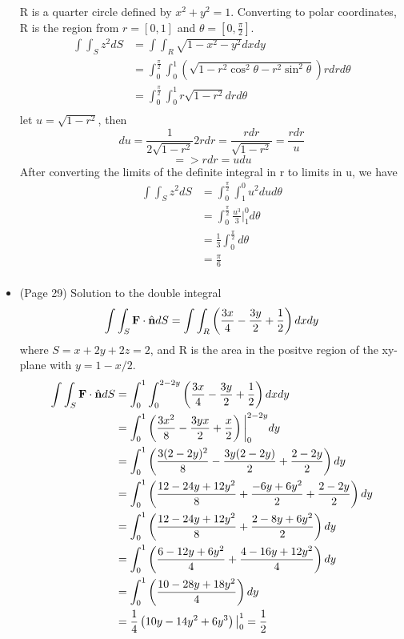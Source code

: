 \documentclass{article}
\begin{document}
\begin{itemize}
    R is a quarter circle defined by $x^2+y^2=1$. Converting to
    polar coordinates, R is the region from $r = [0,1]$ and
    $\theta = [0, \frac{\pi}{2}]$.
    \begin{align*}
        \int\int_S z^2dS &= \int\int_R \sqrt{1-x^2-y^2}dxdy \\
        &= \int_0^\frac{\pi}{2}\int_0^1 (\sqrt{1-r^2\cos^2\theta-r^2\sin^2\theta})rdrd\theta \\
        &= \int_0^\frac{\pi}{2}\int_0^1 r\sqrt{1-r^2}drd\theta \\
    \end{align*}
    let $u = \sqrt{1-r^2}$, then
    \[ du = \frac{1}{2\sqrt{1-r^2}}2rdr = \frac{rdr}{\sqrt{1-r^2}} = \frac{rdr}{u} \]
    \[ => rdr = udu \]
    After converting the limits of the definite integral in r to limits in u, we have
    \begin{align*}
        \int\int_S z^2dS &= \int_0^\frac{\pi}{2}\int_1^0 u^2dud\theta \\
        &= \int_0^\frac{\pi}{2} \frac{u^3}{3} \bigg|_{1}^{0} d\theta \\
        &= \frac{1}{3} \int_0^\frac{\pi}{2}d\theta \\
        &= \frac{\pi}{6} \\
    \end{align*}

    \item (Page 29) Solution to the double integral
    \[ \int\int_S \textbf{F}\cdot\hat{\textbf{n}}dS = \int\int_R \left( \frac{3x}{4} - \frac{3y}{2} + \frac{1}{2} \right) dxdy \]
    where $S = x + 2y + 2z = 2$, and R is the area in the positve region of the xy-plane
    with $y = 1 - x/2$.
    \begin{align*}
        \int\int_S \textbf{F}\cdot\hat{\textbf{n}}dS &= \int_0^1\int_0^{2-2y} \left( \frac{3x}{4} - \frac{3y}{2} + \frac{1}{2} \right) dxdy \\
        &= \int_0^1\left( \frac{3x^2}{8} - \frac{3yx}{2} + \frac{x}{2} \right) \bigg|_0^{2-2y} dy \\
        &= \int_0^1\left( \frac{3(2-2y)^2}{8} - \frac{3y(2-2y)}{2} + \frac{2-2y}{2} \right) dy \\
        &= \int_0^1\left( \frac{12-24y+12y^2}{8} + \frac{-6y+6y^2}{2} + \frac{2-2y}{2} \right) dy \\
        &= \int_0^1\left( \frac{12-24y+12y^2}{8} + \frac{2-8y+6y^2}{2} \right) dy \\
        &= \int_0^1\left( \frac{6-12y+6y^2}{4} + \frac{4-16y+12y^2}{4} \right) dy \\
        &= \int_0^1\left( \frac{10-28y+18y^2}{4} \right) dy \\
        &= \frac{1}{4} \left( 10y-14y^2+6y^3 \right) \big|_0^1
        = \frac{1}{2} \\
    \end{align*}
\end{itemize}
\end{document}

